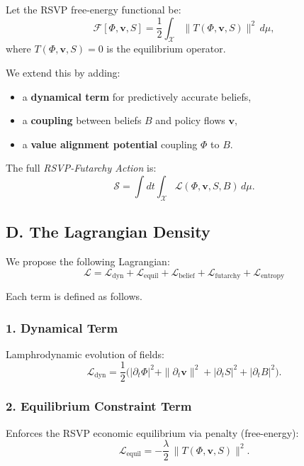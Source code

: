 \documentclass[12pt]{article}
\begin{document}
Let the RSVP free-energy functional be:
\[
\mathcal{F}[\Phi,\mathbf{v},S]
    = \frac{1}{2}\int_{\mathcal{X}}
        \|T(\Phi,\mathbf{v},S)\|^2 \, d\mu,
\]
where $T(\Phi,\mathbf{v},S)=0$ is the equilibrium operator.

We extend this by adding:
\begin{itemize}
\item a \textbf{dynamical term} for predictively accurate beliefs,
\item a \textbf{coupling} between beliefs $B$ and policy flows $\mathbf{v}$,
\item a \textbf{value alignment potential} coupling $\Phi$ to $B$.
\end{itemize}

The full \emph{RSVP-Futarchy Action} is:
\[
\mathcal{S} = \int dt \int_{\mathcal{X}} 
\mathcal{L}(\Phi, \mathbf{v}, S, B) \, d\mu.
\]

\subsection*{D. The Lagrangian Density}

We propose the following Lagrangian:
\begin{equation}
\boxed{
\mathcal{L}
=
\mathcal{L}_{\text{dyn}}
+
\mathcal{L}_{\text{equil}}
+
\mathcal{L}_{\text{belief}}
+
\mathcal{L}_{\text{futarchy}}
+
\mathcal{L}_{\text{entropy}}
}
\end{equation}

Each term is defined as follows.

\subsubsection*{1. Dynamical Term}

Lamphrodynamic evolution of fields:
\[
\mathcal{L}_{\text{dyn}}
=
\frac{1}{2}\Big(
    |\partial_t \Phi|^2
  + \|\partial_t \mathbf{v}\|^2
  + |\partial_t S|^2
  + |\partial_t B|^2
\Big).
\]

\subsubsection*{2. Equilibrium Constraint Term}

Enforces the RSVP economic equilibrium via penalty (free-energy):
\[
\mathcal{L}_{\text{equil}}
=
- \frac{\lambda}{2}\,
    \|T(\Phi, \mathbf{v}, S)\|^2.
\]
\end{document}
